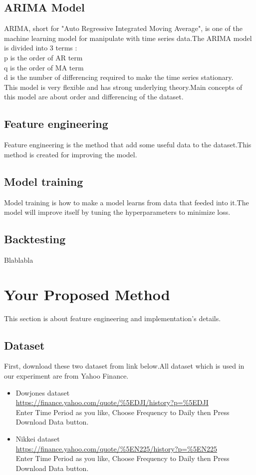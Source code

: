 \documentclass{article}
\begin{document}
\subsection{ARIMA Model}
ARIMA, short for "Auto Regressive Integrated Moving Average", is one of the machine learning model for manipulate with time series data.The ARIMA model is divided into 3 terms :\\p is the order of AR term\\q is the order of MA term\\d is the number of differencing required to make the time series stationary.\\This model is very flexible and has strong underlying theory.Main concepts of this model are about order and differencing of the dataset. 

\subsection{Feature engineering}
Feature engineering is the method that add some useful data to the dataset.This method is created for improving the model.

\subsection{Model training}
Model training is how to make a model learns from data that feeded into it.The model will improve itself by tuning the hyperparameters to minimize loss.

\subsection{Backtesting}
Blablabla

\section{Your Proposed Method}\label{sec:yourmethod}
This section is about feature engineering and implementation's details.

\subsection{Dataset}
First, download these two dataset from link below.All dataset which is used in our experiment are from Yahoo Finance.

\begin{itemize}
\item Dowjones dataset\\
\url{https://finance.yahoo.com/quote/%5EDJI/history?p=%5EDJI}
\\Enter Time Period as you like, Choose Frequency to Daily then Press Download Data button.

\item Nikkei dataset\\
\url{https://finance.yahoo.com/quote/%5EN225/history?p=%5EN225}
\\Enter Time Period as you like, Choose Frequency to Daily then Press Download Data button.
\end{itemize}
\end{document}
